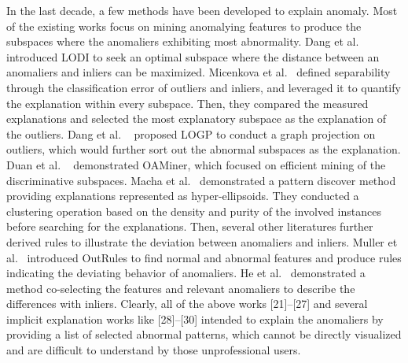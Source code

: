 In the last decade,
a few methods have been developed to explain anomaly.
Most of the existing works focus on mining anomalying features to 
produce the subspaces where 
the anomaliers exhibiting most abnormality. 
Dang et al.~\cite{dang2013local} introduced LODI to 
seek an optimal subspace where 
the distance between an anomaliers and 
inliers can be maximized. 
Micenkova et al.~\cite{micenkova2013explaining}
defined separability through the classification error of outliers and 
inliers, 
and leveraged it to 
quantify the explanation within every subspace. 
Then, 
they compared the measured explanations and 
selected the most explanatory subspace as the explanation of the outliers. 
Dang et al. ~\cite{dang2014discriminative} 
proposed LOGP to 
conduct a graph projection on outliers, 
which would further sort out the abnormal subspaces as the explanation. 
Duan et al. ~\cite{duan2015mining} 
demonstrated OAMiner, 
which focused on efficient mining of the discriminative subspaces. 
Macha et al.~\cite{macha2018explaining} 
demonstrated a pattern discover method providing explanations represented as hyper-ellipsoids. 
They conducted a clustering operation based on the density and 
purity of the involved instances before searching for the explanations. 
Then, 
several other literatures further derived rules to 
illustrate the deviation between anomaliers and 
inliers. 
Muller et al.~\cite{muller2012outrules} 
introduced OutRules to 
find normal and abnormal features and 
produce rules indicating the deviating behavior of anomaliers. 
He et al.~\cite{he2010co} 
demonstrated a method co-selecting the features and 
relevant anomaliers to 
describe the differences with inliers. 
Clearly, 
all of the above works [21]–[27] and 
several implicit explanation works like [28]–[30] intended to 
explain the anomaliers by providing a list of selected abnormal patterns, 
which cannot be directly visualized and 
are difficult to understand 
by those unprofessional users.




